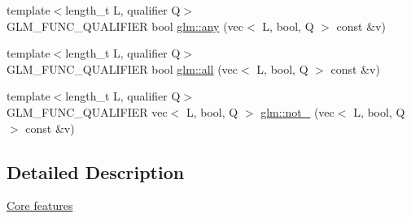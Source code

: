 \begin{DoxyCompactItemize}
\item 
{\footnotesize template$<$length\+\_\+t L, qualifier Q$>$ }\\G\+L\+M\+\_\+\+F\+U\+N\+C\+\_\+\+Q\+U\+A\+L\+I\+F\+I\+ER bool \hyperlink{group__core__func__vector__relational_gadcc289349a96ef7642b14bc151ee4ae8}{glm\+::any} (vec$<$ L, bool, Q $>$ const \&v)
\item 
{\footnotesize template$<$length\+\_\+t L, qualifier Q$>$ }\\G\+L\+M\+\_\+\+F\+U\+N\+C\+\_\+\+Q\+U\+A\+L\+I\+F\+I\+ER bool \hyperlink{group__core__func__vector__relational_gab5af106b2d5675d51af84815d937384d}{glm\+::all} (vec$<$ L, bool, Q $>$ const \&v)
\item 
{\footnotesize template$<$length\+\_\+t L, qualifier Q$>$ }\\G\+L\+M\+\_\+\+F\+U\+N\+C\+\_\+\+Q\+U\+A\+L\+I\+F\+I\+ER vec$<$ L, bool, Q $>$ \hyperlink{group__core__func__vector__relational_ga464f1392c934f69a917ab8bb6eda5b09}{glm\+::not\+\_\+} (vec$<$ L, bool, Q $>$ const \&v)
\end{DoxyCompactItemize}


\subsection{Detailed Description}
\hyperlink{group__core}{Core features} 